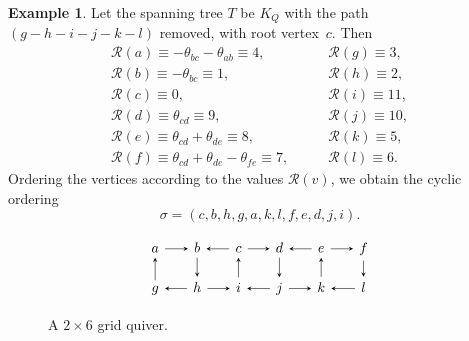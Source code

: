 \documentclass[11pt, letterpaper]{amsart}
\theoremstyle{definition}
\newtheorem{example}[theorem]{Example}
\numberwithin{equation}{section}
\begin{document}
\begin{example}
Let the spanning tree $T$ be $K_Q$ with the path $(g - h - i - j  - k - l)$ removed, with root vertex~$c$.
Then 
\begin{equation*}
\begin{array}{ll}
\mathcal{R}(a) \equiv -\theta_{bc} - \theta_{ab} \equiv  4, &\mathcal{R}(g) \equiv 3, \\[2pt]
\mathcal{R}(b) \equiv -\theta_{bc} \equiv 1, &\mathcal{R}(h) \equiv 2, \\[2pt]
\mathcal{R}(c) \equiv 0, &\mathcal{R}(i) \equiv 11, \\[2pt]
\mathcal{R}(d) \equiv \theta_{cd}\equiv 9, &\mathcal{R}(j) \equiv 10,\\[2pt]
\mathcal{R}(e)\equiv \theta_{cd} + \theta_{de} \equiv 8, &\mathcal{R}(k) \equiv 5,\\[2pt]
\mathcal{R}(f) \equiv \theta_{cd} + \theta_{de} - \theta_{fe} \equiv 7, \qquad &\mathcal{R}(l) \equiv 6.
\end{array}
\end{equation*}
Ordering the vertices according to the values $\mathcal{R}(v)$, we obtain the cyclic ordering
$$\sigma = (c, b, h, g, a, k, l, f, e, d, j, i).$$
\end{example}

\enlargethispage{5pt}

\begin{figure}[h]
\vspace{-5pt}
\begin{equation*}
\begin{tikzcd}[arrows={-stealth}, sep=1.6em]
  a  \arrow[r] & b \arrow[d] & c \arrow[r] \arrow[l] & d \arrow[d] & e \arrow[r] \arrow[l] & f \arrow[d]   \\[-4pt]
  g  \arrow[u] & h \arrow[r] \arrow[l] & i \arrow[u] & j \arrow[r] \arrow[l] & k \arrow[u] & l \arrow[l]  
\end{tikzcd}
\end{equation*}
\vspace{-8pt}
\caption{A $2 \times 6$ grid quiver.} %
\vspace{-8pt}
\label{fig:grid2x6}
\end{figure}

\pagebreak[3]
\end{document}
